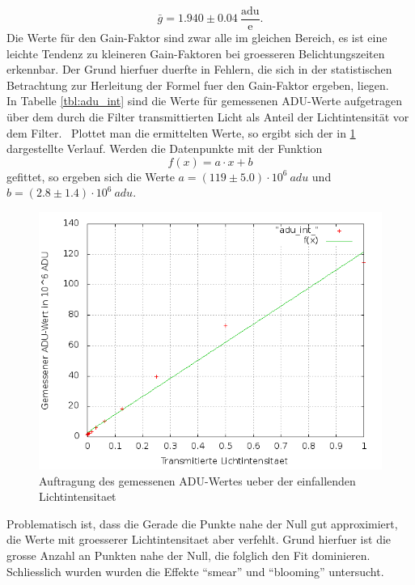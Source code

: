 \begin{equation}
\bar{g} = 1.940 \pm 0.04 \ \frac{\mathrm{adu}}{\mathrm{e}}. 
\end{equation}
Die Werte für den Gain-Faktor sind zwar alle im gleichen Bereich, es ist eine leichte Tendenz zu kleineren Gain-Faktoren bei groesseren Belichtungszeiten erkennbar. Der Grund hierfuer duerfte in Fehlern, die sich in der statistischen Betrachtung zur Herleitung der Formel fuer den Gain-Faktor ergeben, liegen. \\
In Tabelle \ref{tbl:adu_int} sind die Werte für gemessenen ADU-Werte aufgetragen über dem durch die Filter transmittierten Licht als Anteil der Lichtintensität vor dem Filter. \
Plottet man die ermittelten Werte, so ergibt sich der in \ref{plot:adu_int} dargestellte Verlauf. Werden die Datenpunkte mit der Funktion 
\begin{equation}
f(x) = a \cdot x + b
\end{equation}
gefittet, so ergeben sich die Werte $a = (119 \pm 5.0) \cdot 10^6 \ adu$ und $b = (2.8 \pm 1.4) \cdot 10^6 \ adu$.
\begin{figure}[h!]
\centering
        \includegraphics[width=.9\textwidth]{adu_int_.png}
\caption{ Auftragung des gemessenen ADU-Wertes ueber der einfallenden Lichtintensitaet }
\label{plot:adu_int}
\end{figure}
Problematisch ist, dass die Gerade die Punkte nahe der Null gut approximiert, die Werte mit groesserer Lichtintensitaet aber verfehlt. Grund hierfuer ist die grosse Anzahl an Punkten nahe der Null, die folglich den Fit dominieren. \\
Schliesslich wurden wurden die Effekte \enquote{smear} und \enquote{blooming} untersucht. 

